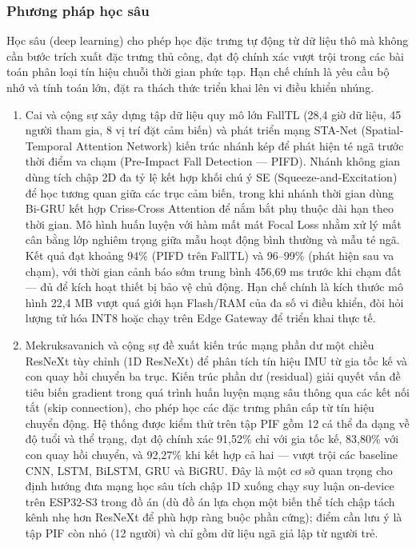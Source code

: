 \documentclass[../DoAn.tex]{subfiles}
\begin{document}
\begin{enumerate}[label=\arabic*)]
\end{enumerate}

\subsubsection{Phương pháp học sâu}
\label{subsubsection:2.1.2.c}

Học sâu (deep learning) cho phép học đặc trưng tự động từ dữ liệu thô mà không cần bước trích xuất đặc trưng thủ công, đạt độ chính xác vượt trội trong các bài toán phân loại tín hiệu chuỗi thời gian phức tạp. Hạn chế chính là yêu cầu bộ nhớ và tính toán lớn, đặt ra thách thức triển khai lên vi điều khiển nhúng.

\begin{enumerate}[label=\arabic*)]

\item Cai và cộng sự \cite{cai2026stanet} xây dựng tập dữ liệu quy mô lớn FallTL (28,4 giờ dữ liệu, 45 người tham gia, 8 vị trí đặt cảm biến) và phát triển mạng STA-Net (Spatial-Temporal Attention Network) kiến trúc nhánh kép để phát hiện té ngã trước thời điểm va chạm (Pre-Impact Fall Detection --- PIFD). Nhánh không gian dùng tích chập 2D đa tỷ lệ kết hợp khối chú ý SE (Squeeze-and-Excitation) để học tương quan giữa các trục cảm biến, trong khi nhánh thời gian dùng Bi-GRU kết hợp Criss-Cross Attention để nắm bắt phụ thuộc dài hạn theo thời gian. Mô hình huấn luyện với hàm mất mát Focal Loss nhằm xử lý mất cân bằng lớp nghiêm trọng giữa mẫu hoạt động bình thường và mẫu té ngã. Kết quả đạt khoảng 94\% (PIFD trên FallTL) và 96--99\% (phát hiện sau va chạm), với thời gian cảnh báo sớm trung bình 456,69 ms trước khi chạm đất --- đủ để kích hoạt thiết bị bảo vệ chủ động. Hạn chế chính là kích thước mô hình 22,4 MB vượt quá giới hạn Flash/RAM của đa số vi điều khiển, đòi hỏi lượng tử hóa INT8 hoặc chạy trên Edge Gateway để triển khai thực tế.

\item Mekruksavanich và cộng sự \cite{mekruksavanich2024resnet} đề xuất kiến trúc mạng phần dư một chiều ResNeXt tùy chỉnh (1D ResNeXt) để phân tích tín hiệu IMU từ gia tốc kế và con quay hồi chuyển ba trục. Kiến trúc phần dư (residual) giải quyết vấn đề tiêu biến gradient trong quá trình huấn luyện mạng sâu thông qua các kết nối tắt (skip connection), cho phép học các đặc trưng phân cấp từ tín hiệu chuyển động. Hệ thống được kiểm thử trên tập PIF gồm 12 cá thể đa dạng về độ tuổi và thể trạng, đạt độ chính xác 91,52\% chỉ với gia tốc kế, 83,80\% với con quay hồi chuyển, và 92,27\% khi kết hợp cả hai --- vượt trội các baseline CNN, LSTM, BiLSTM, GRU và BiGRU. Đây là một cơ sở quan trọng cho định hướng đưa mạng học sâu tích chập 1D xuống chạy suy luận on-device trên ESP32-S3 trong đồ án (dù đồ án lựa chọn một biến thể tích chập tách kênh nhẹ hơn ResNeXt để phù hợp ràng buộc phần cứng); điểm cần lưu ý là tập PIF còn nhỏ (12 người) và chỉ gồm dữ liệu ngã giả lập từ người trẻ.


\end{enumerate}
\end{document}
